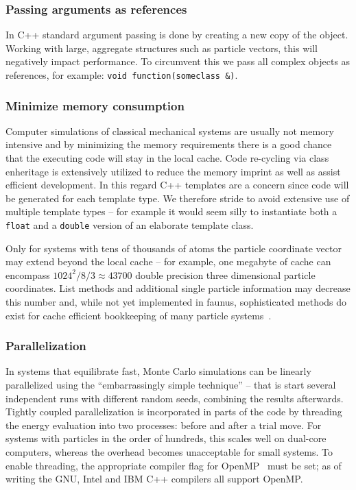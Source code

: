 \documentclass[10pt]{bmc_article}
\newenvironment{bmcformat}{\begin{raggedright}\baselineskip20pt\sloppy\setboolean{publ}{false}}{\end{raggedright}\baselineskip20pt\sloppy}
\begin{document}
\begin{bmcformat}
\subsubsection*{Passing arguments as references}
In C++ standard argument passing is done by creating a new copy of the object.
Working with large, aggregate structures such as particle vectors, this will negatively impact performance. To circumvent this we pass all complex objects as references, for example: \verb"void function(someclass &)".

\subsubsection*{Minimize memory consumption}
Computer simulations of classical mechanical systems are usually not memory intensive and by minimizing the memory requirements there is a good chance that the executing code will stay in the local cache.
Code re-cycling via class enheritage is extensively utilized to reduce the memory imprint as well as assist efficient development.
In this regard C++ templates are a concern since code will be generated for each template type.
We therefore stride to avoid extensive use of multiple template types -- for example it would seem silly to instantiate both a \verb"float" and a \verb"double" version of an elaborate template class.

Only for systems with tens of thousands of atoms the particle coordinate vector may extend beyond the local cache -- for example, one megabyte of cache can encompass $1024^2/8/3\approx 43700$ double precision three dimensional particle coordinates. List methods and additional single particle information may decrease this number and, while not yet implemented in faunus, sophisticated methods do exist for cache efficient bookkeeping of many particle systems~\cite{meloni:121102}.

\subsubsection*{Parallelization}
In systems that equilibrate fast, Monte Carlo simulations can be linearly parallelized using the ``embarrassingly simple technique'' -- that is start several independent runs with different random seeds, combining the results afterwards.
Tightly coupled parallelization is incorporated in parts of the code by threading the energy evaluation into two processes: before and after a trial move.
For systems with particles in the order of hundreds, this scales well on dual-core computers, whereas the overhead becomes unacceptable for small systems.
To enable threading, the appropriate compiler flag for OpenMP~\cite{openmp:98} must be set; as of writing the GNU, Intel and IBM C++ compilers all support OpenMP.


\end{bmcformat}
\end{document}
